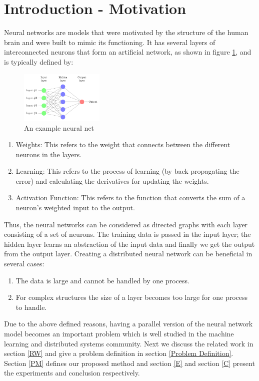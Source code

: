 \documentclass{sig-alternate-05-2015}
\begin{document}
\section{Introduction - Motivation}
Neural networks are models that were motivated by the structure of the human brain and were built to mimic its functioning. It has several layers of interconnected neurons that form an artificial network, as shown in figure \ref{NN}, and is typically defined by:
\begin{figure}[h]
\centering
\includegraphics[width=4cm]{img/neural-network}
\caption{An example neural net}
\label{NN}
\end{figure}
\begin{enumerate}
\item Weights: This refers to the weight that connects between the different neurons in the layers.
\item Learning: This refers to the process of learning (by back propagating the error) and calculating the derivatives for updating the weights.
\item Activation Function: This refers to the function that converts the sum of a neuron's weighted input to the output.
\end{enumerate}
Thus, the neural networks can be considered as directed graphs with each layer consisting of a set of neurons. The training data is passed in the input layer; the hidden layer learns an abstraction of the input data and finally we get the output from the output layer.
Creating a distributed neural network can be beneficial in several cases:
\begin{enumerate}
\item The data is large and cannot be handled by one process.
\item For complex structures the size of a layer becomes too large for one process to handle.
\end{enumerate}
Due to the above defined reasons, having a parallel version of the neural network model becomes an important problem which is well studied in the machine learning and distributed systems community. Next we discuss the related work in section \ref{RW} and give a problem definition in section \ref{Problem Definition}. Section \ref{PM} defines our proposed method and section \ref{E} and section \ref{C} present the experiments and conclusion respectively.
\end{document}
